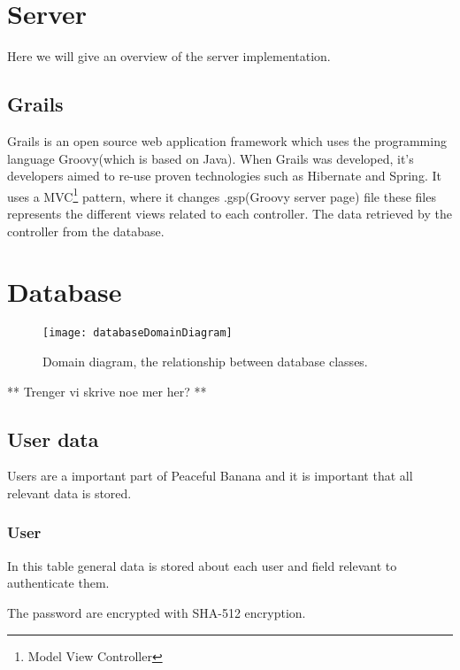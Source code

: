 \section{Server}
Here we will give an overview of the server implementation.

\subsection{Grails}
Grails is an open source web application framework which uses the programming language Groovy(which is based on Java). When Grails was developed, it's developers aimed to re-use proven technologies such as Hibernate and Spring. It uses a MVC\footnote{Model View Controller} pattern, where it changes .gsp(Groovy server page) file these files represents the different views related to each controller. The data retrieved by the controller from the database.

\section{Database}
\begin{figure}[h!]
\label{newnotification}
\centering
	\texttt{[image: databaseDomainDiagram]}
\caption{Domain diagram, the relationship between database classes.}
\end{figure}

** Trenger vi skrive noe mer her? **


\subsection{User data}
Users are a important part of Peaceful Banana and it is important that all relevant data is stored. \\

\subsubsection*{User}
In this table general data is stored about each user and field relevant to authenticate them.

The password are encrypted with SHA-512 encryption.\\

